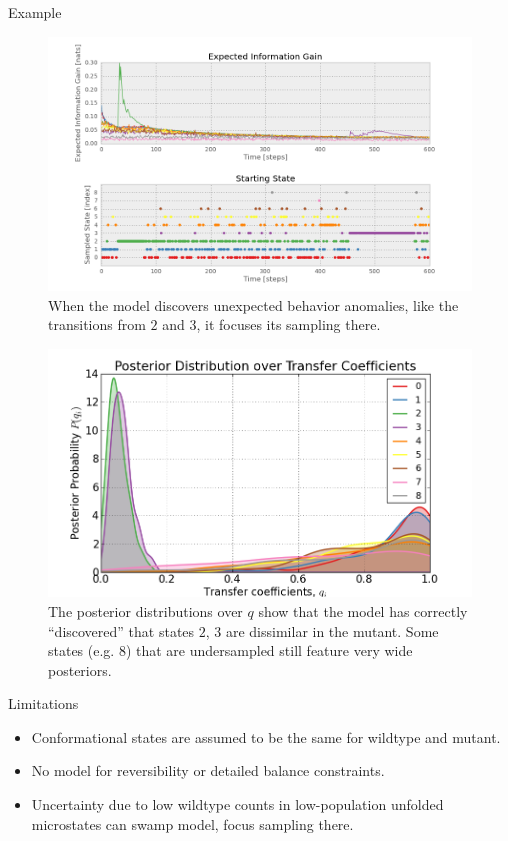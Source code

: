 \documentclass[final]{beamer}
\begin{document}
\begin{frame}{}
\begin{columns}[t]
\begin{column}{.3\linewidth}
\begin{block}{Example}
\end{block}

\begin{figure}
 \includegraphics[width=\textwidth]{../code/9x9graph/plots/information_gain.png}
    \caption{When the model discovers unexpected behavior anomalies, like the transitions from $2$ and $3$, it focuses its sampling there.}
\end{figure}

\begin{figure}
 \includegraphics[width=\textwidth]{../code/9x9graph/posterior_q.png}
    \caption{The posterior distributions over $q$ show that the model has correctly ``discovered'' that states $2$, $3$ are dissimilar in the mutant. Some states (e.g. $8$) that are undersampled still feature very wide posteriors.}
\end{figure}


    
\begin{block}{Limitations}
\begin{itemize}
\item Conformational states are assumed to be the same for wildtype and mutant.
\item No model for reversibility or detailed balance constraints.
\item Uncertainty due to low wildtype counts in low-population unfolded microstates can swamp model, focus sampling there.
\end{itemize}
\end{block}
\vspace{0.5in}


\end{column}
\end{columns}
\end{frame}
\end{document}
